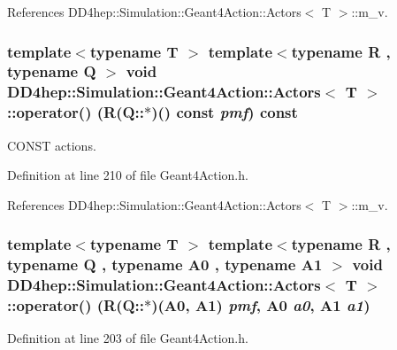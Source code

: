 References DD4hep::Simulation::Geant4Action::Actors$<$ T $>$::m\_\-v.\hypertarget{class_d_d4hep_1_1_simulation_1_1_geant4_action_1_1_actors_ae2a3a67ccb7be19f771a7f88603b6258}{
\subsubsection[{operator()}]{\setlength{\rightskip}{0pt plus 5cm}template$<$typename T $>$ template$<$typename R , typename Q $>$ void {\bf DD4hep::Simulation::Geant4Action::Actors}$<$ {\bf T} $>$::operator() (R(Q::$\ast$)() const  {\em pmf}) const}}
\label{class_d_d4hep_1_1_simulation_1_1_geant4_action_1_1_actors_ae2a3a67ccb7be19f771a7f88603b6258}


CONST actions. 

Definition at line 210 of file Geant4Action.h.

References DD4hep::Simulation::Geant4Action::Actors$<$ T $>$::m\_\-v.\hypertarget{class_d_d4hep_1_1_simulation_1_1_geant4_action_1_1_actors_adda539c63130d35cbb7348c715770bb6}{
\subsubsection[{operator()}]{\setlength{\rightskip}{0pt plus 5cm}template$<$typename T $>$ template$<$typename R , typename Q , typename A0 , typename A1 $>$ void {\bf DD4hep::Simulation::Geant4Action::Actors}$<$ {\bf T} $>$::operator() (R(Q::$\ast$)(A0, A1) {\em pmf}, \/  A0 {\em a0}, \/  A1 {\em a1})}}
\label{class_d_d4hep_1_1_simulation_1_1_geant4_action_1_1_actors_adda539c63130d35cbb7348c715770bb6}


Definition at line 203 of file Geant4Action.h.

